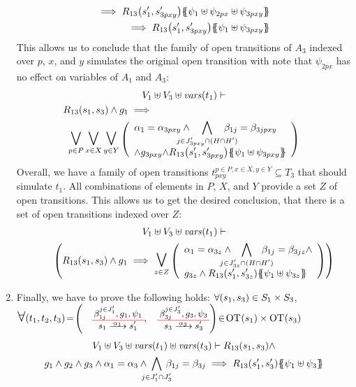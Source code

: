 \documentclass[runningheads]{llncs}
\begin{document}
\begin{enumerate}
\begin{align*}
\implies R_{13}\mpar{s'_1,s'_{3pxy}}
\psubst{\psi_1 \uplus \psi_{2px} \uplus \psi_{3pxy}}  \\ 
\implies R_{13}\mpar{s'_1,s'_{3pxy}}\psubst{\psi_1  \uplus \psi_{3pxy}}
\end{align*}
This allows us to conclude that the family of open transitions of $A_3$ indexed over $p$, $x$,  and $y$ simulates the original open transition  with note that $\psi_{2px}$ has no effect on variables of $A_1$ and $A_3$:
\begin{multline*}
V_1  \uplus V_3  \uplus \fvars{t_1} \vdash\\
R_{13}(s_1,s_3)  \wedge g_1 \implies 
\hspace{5.5cm}\\
\operatorname*{\bigsymb{\bigvee}}_{p\in P}
\operatorname*{\bigsymb{\bigvee}}_{x \in X} 
\operatorname*{\bigsymb{\bigvee}}_{y \in Y}
\mpar{\everymath{\displaystyle}
\begin{array}{l}
\alpha_1=\alpha_{3pxy}\wedge \bigwedge_\subbox{j \in J'_{3pxy} \cap (H\cap H')} \beta_{1j}=\beta_{3jpxy} \\ \wedge g_{3pxy} 
{\wedge R_{13}\mpar{s'_1,s'_{3pxy}}}\psubst{\psi_1  \uplus \psi_{3pxy}}
\end{array}}
\end{multline*}
Overall, we have a family of open transitions $t^{p\in P,x\in X,y\in Y}_{pxy} \subseteq T_3$ that should simulate $t_1$. All  combinations of elements in $P$, $X$, and $Y$ provide a set $Z$ of  open transitions.  This allows us to get the desired conclusion, that there is a set of  open transitions indexed over $Z$:
\begin{multline*}
V_1 \uplus  V_3 \uplus \fvars{t_1}
\vdash\\\hspace{2em}
\mpar{R_{13}\mpar{s_1, s_3} \wedge g_1 \implies 
\operatorname*{\bigsymb{\bigvee}}_{z \in Z}
\mpar{\everymath{\displaystyle}
\begin{array}{l}
\alpha_1=\alpha_{3z}\wedge \bigwedge_\subbox{j \in J'_{3z} \cap (H\cap H')} \beta_{1j}=\beta_{3jz} \wedge \\g_{3z}\wedge 
{R_{13}\mpar{s'_1,s'_{3z}}}\psubst{\psi_1  \uplus \psi_{3z}}
\end{array}}}
\end{multline*}	
\medskip
\item  Finally, we have to prove the following holds:
$\forall {\left(s_1,s_3\right)} \in S_1 \times S_3$, $\bigsymb{\forall} \mpar{t_1,t_2, t_{3}}\!=\! \mpar{\OTx{1}{}{1}{1},\OTx{3}{}{3}{3}}\! \in\! \fOT{s_1} \times \fOT{s_3}$
\begin{multline*}
V_1 \uplus V_3 \uplus \fvars{t_1}  \uplus \fvars{t_3} \vdash R_{13}\mpar{s_1, s_3} \wedge \\ g_1 \wedge g_{2} \wedge g_{3}
\wedge \alpha_1 = \alpha_{3}  \wedge \bigwedge_\subbox{j \in J'_1\cap  J'_{3}} \beta_{1j} = \beta_{3j}
 \implies R_{13}\mpar{s'_1, s'_3} \psubst{\psi_1 \uplus \psi_3 } 
\end{multline*}



\end{enumerate}
\end{document}
